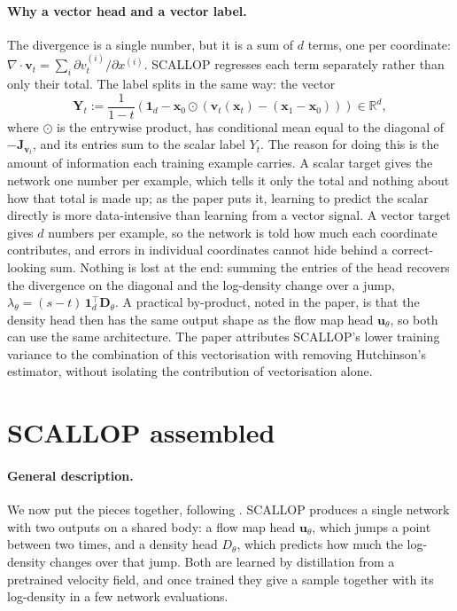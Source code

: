 \documentclass[11pt,a4paper]{article}
\numberwithin{equation}{section}     %
\theoremstyle{plain}        %
\theoremstyle{definition}   %
\theoremstyle{remark}       %
\begin{document}
\paragraph{Why a vector head and a vector label.} The divergence is a single number, but it is a sum of $d$ terms, one per coordinate: $\nabla\cdot\mathbf{v}_t=\sum_i\partial v_t^{(i)}/\partial x^{(i)}$. SCALLOP \citep{ouyang2026} regresses each term separately rather than only their total. The label splits in the same way: the vector
\[
\mathbf{Y}_t:=\frac{1}{1-t}\left(\mathbf{1}_d-\mathbf{x}_0\odot\left(\mathbf{v}_t(\mathbf{x}_t)-(\mathbf{x}_1-\mathbf{x}_0)\right)\right)\in\mathbb{R}^d,
\]
where $\odot$ is the entrywise product, has conditional mean equal to the diagonal of $-\mathbf{J}_{\mathbf{v}_t}$, and its entries sum to the scalar label $Y_t$. The reason for doing this is the amount of information each training example carries. A scalar target gives the network one number per example, which tells it only the total and nothing about how that total is made up; as the paper puts it, learning to predict the scalar directly is more data-intensive than learning from a vector signal. A vector target gives $d$ numbers per example, so the network is told how much each coordinate contributes, and errors in individual coordinates cannot hide behind a correct-looking sum. Nothing is lost at the end: summing the entries of the head recovers the divergence on the diagonal and the log-density change over a jump, $\lambda_\theta=(s-t)\,\mathbf{1}_d^\top\mathbf{D}_\theta$. A practical by-product, noted in the paper, is that the density head then has the same output shape as the flow map head $\mathbf{u}_\theta$, so both can use the same architecture. The paper attributes SCALLOP's lower training variance to the combination of this vectorisation with removing Hutchinson's estimator, without isolating the contribution of vectorisation alone.


\newpage

\section{SCALLOP assembled}\label{sec:assembled}

\paragraph{General description.} We now put the pieces together, following \citet{ouyang2026}. SCALLOP produces a single network with two outputs on a shared body: a flow map head $\mathbf{u}_\theta$, which jumps a point between two times, and a density head $D_\theta$, which predicts how much the log-density changes over that jump. Both are learned by distillation from a pretrained velocity field, and once trained they give a sample together with its log-density in a few network evaluations.
\end{document}
